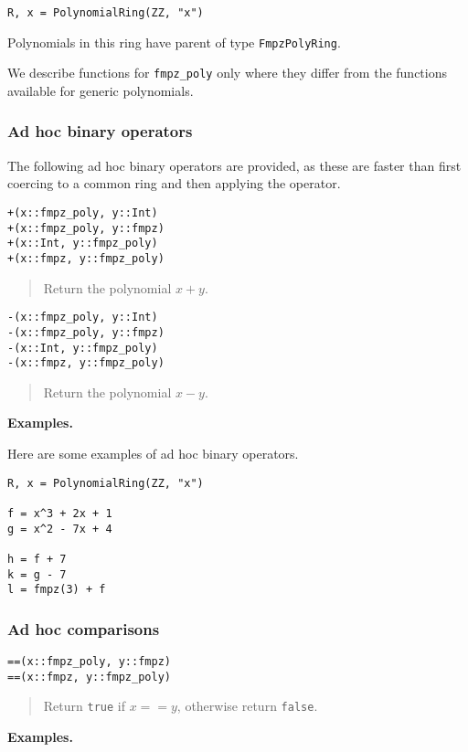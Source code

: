 \documentclass[a4paper,10pt]{article}
\newcommand{\code}{\lstinline}
\newcommand{\desc}[1]{\vspace{-3mm}\begin{quote}#1\end{quote}}
\begin{document}
{{\begin{lstlisting}
R, x = PolynomialRing(ZZ, "x")
\end{lstlisting}

Polynomials in this ring have parent of type \code{FmpzPolyRing}.

We describe functions for \code{fmpz_poly} only where they differ from the functions
available for generic polynomials.

\subsubsection{Ad hoc binary operators}

The following ad hoc binary operators are provided, as these are faster than first coercing
to a common ring and then applying the operator.

\begin{lstlisting}
+(x::fmpz_poly, y::Int)
+(x::fmpz_poly, y::fmpz)
+(x::Int, y::fmpz_poly)
+(x::fmpz, y::fmpz_poly)
\end{lstlisting}

\desc{Return the polynomial $x + y$.}

\begin{lstlisting}
-(x::fmpz_poly, y::Int)
-(x::fmpz_poly, y::fmpz)
-(x::Int, y::fmpz_poly)
-(x::fmpz, y::fmpz_poly)
\end{lstlisting}

\desc{Return the polynomial $x - y$.}

\textbf{Examples.}

Here are some examples of ad hoc binary operators.

\begin{lstlisting}
R, x = PolynomialRing(ZZ, "x")

f = x^3 + 2x + 1
g = x^2 - 7x + 4

h = f + 7
k = g - 7
l = fmpz(3) + f
\end{lstlisting}

\subsubsection{Ad hoc comparisons}

\begin{lstlisting}
==(x::fmpz_poly, y::fmpz)
==(x::fmpz, y::fmpz_poly)
\end{lstlisting}

\desc{Return \code{true} if $x == y$, otherwise return \code{false}.}

\textbf{Examples.}

}}
\end{document}
